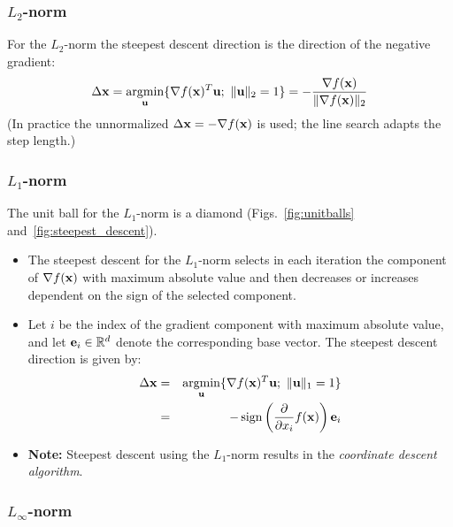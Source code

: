 \subsubsection{\texorpdfstring{$L_2$}{L2}-norm}
  For the $L_2$-norm the steepest descent direction is the direction of the negative gradient:
  \begin{displaymath}
    \Delta \bm{\mathrm{x}}
    = \operatorname*{argmin}_{\bm{\mathrm{u}}} \{\nabla f(\bm{\mathrm{x}})^T \bm{\mathrm{u}} ; \ \| \bm{\mathrm{u}}\|_2 = 1\}
    = -\frac{\nabla f(\bm{\mathrm{x}})}{\|\nabla f(\bm{\mathrm{x}})\|_2}
  \end{displaymath}
  {\small (In practice the unnormalized $\Delta\bm{\mathrm{x}} = -\nabla f(\bm{\mathrm{x}})$ is used; the line search adapts the step length.)}

\subsubsection{\texorpdfstring{$L_1$}{L1}-norm}

  The unit ball for the $L_1$-norm is a diamond (Figs.~\ref{fig:unitballs} and~\ref{fig:steepest_descent}).
   \begin{itemize}
    \item The steepest descent for the $L_1$-norm selects in each iteration 
      the component of $\nabla f(\bm{\mathrm{x}})$ with maximum absolute value and then 
      decreases or increases dependent on the sign of the selected component.   
    \item Let $i$ be the index of the gradient component with maximum absolute 
      value, and let $\bm{\mathrm{e}}_i\in\mathbb{R}^d$ denote the corresponding base vector.
      The steepest descent direction is given by:
      \begin{eqnarray*}
        \Delta \bm{\mathrm{x}} &=& \operatorname*{argmin}_{\bm{\mathrm{u}}} \{\nabla f(\bm{\mathrm{x}})^T \bm{\mathrm{u}} ; \ \| \bm{\mathrm{u}}\|_1 = 1\} \\
                      &=& -\operatorname{sign}\left(\frac{\partial}{\partial x_i} f(\bm{\mathrm{x}})\right)\bm{\mathrm{e}}_i
      \end{eqnarray*}
        
    \item  \textbf{Note:} Steepest descent using the $L_1$-norm results in the {\em coordinate descent algorithm}.
  \end{itemize}
   
\subsubsection{\texorpdfstring{$L_\infty$}{L-infinity}-norm}

